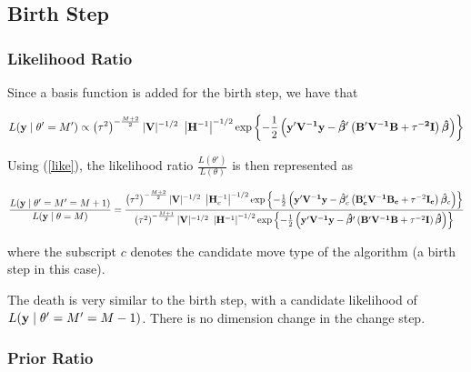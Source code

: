 \documentclass[
]{article}
\begin{document}
\hypertarget{birth}{%
\subsection{Birth Step}\label{birth}}

\hypertarget{likelihood-ratio}{%
\subsubsection{Likelihood Ratio}\label{likelihood-ratio}}

Since a basis function is added for the birth step, we have that

\begin{equation}
L({\bf y} \mid {\theta' = M'}) \propto 
\left(\tau^2\right)^{-\frac{M+2}{2}}  |{\bf V}|^{-1/2}~ \left|{\bf H}^{-1}\right|^{-1/2} \exp\left\lbrace-\frac{1}{2}\left(\bf{y'V^{-1}y} - \boldsymbol{\hat{\beta}}' \left(\bf{B'V^{-1}B} + \tau^{-2} {\bf I}\right) \boldsymbol{\hat\beta}\right)\right\rbrace
\end{equation}

Using (\ref{like}), the likelihood ratio
\(\frac{L(\theta')}{L(\theta)}\) is then represented as

\begin{equation}
\label{12}
\frac{L({\bf y} \mid {\theta' = M'=M+1})}{L({\bf y} \mid {\theta = M})} = \frac{\left(\tau^2\right)^{-\frac{M+2}{2}}  |{\bf V}|^{-1/2}~ \left|{\bf H}^{-1}_c\right|^{-1/2} \exp\left\lbrace-\frac{1}{2}\left({\bf y'V^{-1}y} - \boldsymbol{\hat{\beta}}'_{c} \left({\bf B'_{c}V^{-1}B_{c}} + \tau^{-2}{\bf I_{c}}\right) \boldsymbol{\hat\beta}_{c}\right)\right\rbrace}
{\left(\tau^2\right)^{-\frac{M+1}{2}}  |{\bf V}|^{-1/2}~ \left|{\bf H}^{-1}\right|^{-1/2} \exp\left\lbrace-\frac{1}{2}\left({\bf y'V^{-1}y} - \boldsymbol{\hat{\beta}}' \left({\bf B'V^{-1}B} + \tau^{-2}{\bf I}\right) \boldsymbol{\hat\beta}\right)\right\rbrace}\\\\
\end{equation}

where the subscript \(c\) denotes the candidate move type of the
algorithm (a birth step in this case).\newline

The death is very similar to the birth step, with a candidate likelihood
of \(L({\bf y} \mid \theta'=M'=M-1)\). There is no dimension change in
the change step.

\hypertarget{prior-ratio}{%
\subsubsection{Prior Ratio}\label{prior-ratio}}
\end{document}
